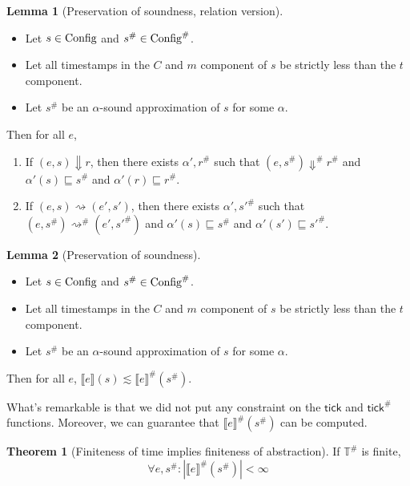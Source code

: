 \documentclass{article}
\theoremstyle{definition}
\newtheorem{lem}{Lemma}[section]
\newtheorem{thm}{Theorem}[section]
\newcommand*{\A}[1]{{#1}^{\#}}
\newcommand*{\Time}{\mathbb{T}}
\newcommand*{\ATime}{\A{\Time}}
\newcommand*{\mem}{m}
\newcommand*{\Config}[1]{\text{Config}\vphantom{#1}}
\newcommand*{\AConfig}[1]{\A{\text{Config}}\vphantom{#1}}
\newcommand*{\sembracket}[1]{\lBrack{#1}\rBrack}
\newcommand*{\tick}{\mathsf{tick}}
\begin{document}
\begin{lem}[Preservation of soundness, relation version]
  $\:$

  \begin{itemize}
    \item Let $s\in\Config{\Time}$ and $\A{s}\in\AConfig{\ATime}$.
    \item Let all timestamps in the $C$ and $\mem$ component of $s$ be strictly less than the $t$ component.
    \item Let $\A{s}$ be an $\alpha$-sound approximation of $s$ for some $\alpha$.
  \end{itemize}

  Then for all $e$,
  \begin{enumerate}
    \item If $(e,s)\Downarrow r$, then there exists $\alpha',\A{r}$ such that $(e,\A{s})\A\Downarrow\A{r}$ and $\alpha'(s)\sqsubseteq\A{s}$ and $\alpha'(r)\sqsubseteq\A{r}$.
    \item If $(e,s)\rightsquigarrow (e',s')$, then there exists $\alpha', \A{s'}$ such that $(e,\A{s})\A\rightsquigarrow(e',\A{s'})$ and $\alpha'(s)\sqsubseteq\A{s}$ and $\alpha'(s')\sqsubseteq\A{s'}$.
  \end{enumerate}
\end{lem}

\begin{lem}[Preservation of soundness]
  $\:$

  \begin{itemize}
    \item Let $s\in\Config{\Time}$ and $\A{s}\in\AConfig{\ATime}$.
    \item Let all timestamps in the $C$ and $\mem$ component of $s$ be strictly less than the $t$ component.
    \item Let $\A{s}$ be an $\alpha$-sound approximation of $s$ for some $\alpha$.
  \end{itemize}

  Then for all $e$, $\sembracket{e}(s)\lesssim\A{\sembracket{e}}(\A{s})$.
\end{lem}

What's remarkable is that we did not put any constraint on the $\tick$ and $\A{\tick}$ functions.
Moreover, we can guarantee that $\A{\sembracket{e}}(\A{s})$ can be computed.

\begin{thm}[Finiteness of time implies finiteness of abstraction]
  If $\ATime$ is finite,
  \[
    \forall e,\A{s}: |\A{\sembracket{e}}(\A{s})|<\infty
  \]
\end{thm}
\end{document}
